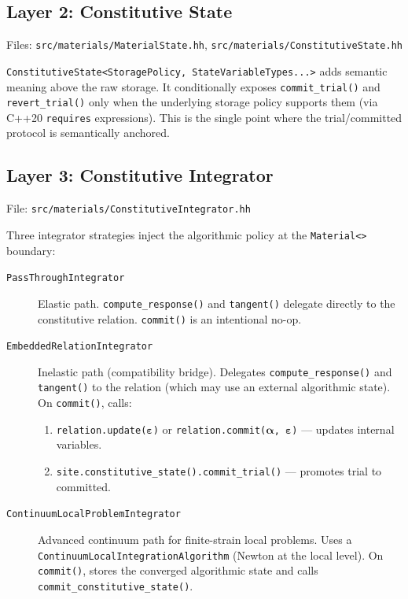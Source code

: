 \subsection{Layer 2: Constitutive State}
\label{sec:layer2-constitutive-state}

Files:
\texttt{src/materials/MaterialState.hh},
\texttt{src/materials/ConstitutiveState.hh}

\texttt{ConstitutiveState<StoragePolicy, StateVariableTypes...>} adds
semantic meaning above the raw storage.  It conditionally exposes
\texttt{commit\_trial()} and \texttt{revert\_trial()} only when the
underlying storage policy supports them (via C++20 \texttt{requires}
expressions).  This is the single point where the trial/committed
protocol is semantically anchored.

\subsection{Layer 3: Constitutive Integrator}
\label{sec:layer3-integrator}

File: \texttt{src/materials/ConstitutiveIntegrator.hh}

Three integrator strategies inject the algorithmic policy at the
\texttt{Material<>} boundary:

\begin{description}
  \item[\texttt{PassThroughIntegrator}]
    Elastic path.  \texttt{compute\_response()} and \texttt{tangent()}
    delegate directly to the constitutive relation.
    \texttt{commit()} is an intentional no-op.

  \item[\texttt{EmbeddedRelationIntegrator}]
    Inelastic path (compatibility bridge).  Delegates
    \texttt{compute\_response()} and \texttt{tangent()} to the
    relation (which may use an external algorithmic state).
    On \texttt{commit()}, calls:
    \begin{enumerate}
      \item \texttt{relation.update($\boldsymbol\varepsilon$)} or
            \texttt{relation.commit($\boldsymbol\alpha$,
            $\boldsymbol\varepsilon$)} --- updates internal variables.
      \item \texttt{site.constitutive\_state().commit\_trial()} ---
            promotes trial to committed.
    \end{enumerate}

  \item[\texttt{ContinuumLocalProblemIntegrator}]
    Advanced continuum path for finite-strain local problems.
    Uses a \texttt{ContinuumLocalIntegrationAlgorithm} (Newton at the
    local level).  On \texttt{commit()}, stores the converged
    algorithmic state and calls \texttt{commit\_constitutive\_state()}.
\end{description}

